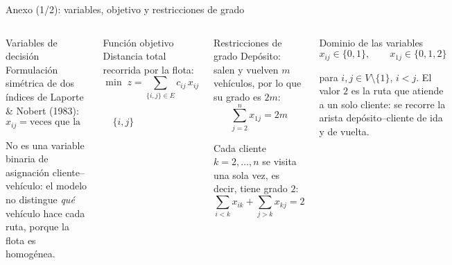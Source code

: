 \documentclass[aspectratio=169, 11pt, xcolor={dvipsnames,table}]{beamer}
\newcommand{\gris}[1]{\textcolor{UsachGris}{#1}}
\begin{document}
\begin{frame}[noframenumbering]{Anexo (1/2): variables, objetivo y restricciones de grado}
\footnotesize
\begin{columns}[T]
\begin{block}{Variables de decisión}
Formulación simétrica de dos índices de Laporte \& Nobert (1983):
\[ x_{ij} = \text{veces que la solución usa } \{i,j\} \]
\vspace{-14pt}

\gris{No es una variable binaria de asignación cliente--vehículo: el modelo no distingue
\textit{qué} vehículo hace cada ruta, porque la flota es homogénea.}
\end{block}
\begin{block}{Función objetivo}
Distancia total recorrida por la flota:
\vspace{-4pt}
\[ \min \; z = \sum_{\{i,j\} \in E} c_{ij}\, x_{ij} \]
\end{block}
\begin{block}{Restricciones de grado}
Depósito: salen y vuelven $m$ vehículos, por lo que su grado es $2m$:
\vspace{-4pt}
\[ \sum_{j=2}^{n} x_{1j} = 2m \]
\vspace{-6pt}

Cada cliente $k=2,\dots,n$ se visita una sola vez, es decir, tiene grado $2$:
\vspace{-4pt}
\[ \sum_{i<k} x_{ik} + \sum_{j>k} x_{kj} = 2 \]
\end{block}
\begin{block}{Dominio de las variables}
\[ x_{ij} \in \{0,1\},\qquad x_{1j} \in \{0,1,2\} \]
\vspace{-12pt}

\gris{para $i,j \in V\setminus\{1\}$, $i<j$. El valor $2$ es la ruta que atiende a un solo
cliente: se recorre la arista depósito--cliente de ida y de vuelta.}
\end{block}
\end{columns}
\end{frame}
\end{document}
